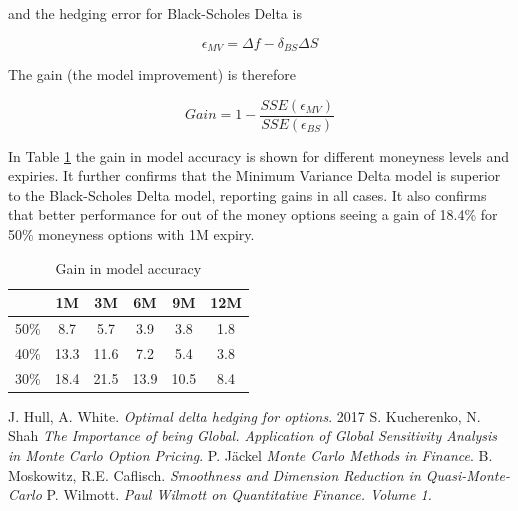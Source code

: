 \documentclass{article}
\begin{document}
and the hedging error for Black-Scholes Delta is

\[
\epsilon_{MV} = \Delta f - \delta_{BS} \Delta S
\]

The gain (the model improvement) is therefore 

\[
Gain = 1 - \frac{SSE(\epsilon_{MV})}{SSE(\epsilon_{BS})}
\]

In Table \ref{tab:gain} the gain in model accuracy is shown for different moneyness levels and expiries. It further confirms that the Minimum Variance Delta model
is superior to the Black-Scholes Delta model, reporting gains in all cases. It also confirms that better performance for out of the money options seeing a gain of
18.4\% for 50\% moneyness options with 1M expiry.

\begin{table}[ht]
    \centering
    \caption{Gain in model accuracy}
    \label{tab:gain}
    \begin{tabular}{|c|c|c|c|c|c|}
        \hline
         &1M & 3M & 6M & 9M & 12M \\
        \hline
        50\% &  8.7 &  5.7 &  3.9 &  3.8 & 1.8 \\
        40\% & 13.3 & 11.6 &  7.2 &  5.4 & 3.8 \\
        30\% & 18.4 & 21.5 & 13.9 & 10.5 & 8.4 \\
        \hline
    \end{tabular}
\end{table}

\newpage

\begin{thebibliography}{9}
J. Hull, A. White. \textit{Optimal delta hedging for options}. 2017
S. Kucherenko, N. Shah \textit{The Importance of being Global. Application of Global Sensitivity Analysis in Monte Carlo Option Pricing}.
P. J{\"a}ckel \textit{Monte Carlo Methods in Finance}.
B. Moskowitz, R.E. Caflisch. \textit{Smoothness and Dimension Reduction in Quasi-Monte-Carlo}
P. Wilmott. \textit{Paul Wilmott on Quantitative Finance. Volume 1.}
\end{thebibliography}
\end{document}
